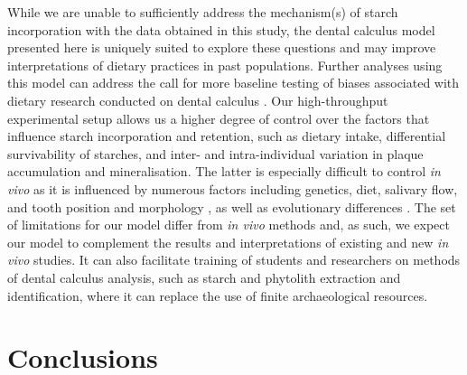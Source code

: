 \documentclass[utf8]{../templates/frontiersSCNS}
\begin{document}
While we are unable to sufficiently address the
mechanism(s) of starch incorporation with the data obtained in this study,
the dental calculus model presented here is uniquely suited to explore
these questions and may improve interpretations of dietary practices in past
populations. Further analyses using this model can address the call for more
baseline testing of biases associated with dietary research conducted on dental calculus
\citep{lemoyneCalculusPretreatments2021}.
Our high-throughput experimental setup allows us a
higher degree of control over the factors that influence starch incorporation and
retention, such as dietary intake, differential survivability of starches,
and inter- and intra-individual variation in plaque accumulation and mineralisation.
The latter is especially difficult to control \emph{in vivo} as it is influenced by
numerous factors including genetics, diet, salivary flow, and tooth position and
morphology
\citep{jepsenCalculusRemoval2011, simonsoroOralGeography2013, proctorSpatialGradient2018, fagernasMicrobialBiogeography2021, haffajeeBiofilmPosition2009},
as well as evolutionary differences \citep{yatesOralMicrobiome2021}. The set of
limitations for our model differ from \emph{in vivo} methods and, as such, we expect
our model to complement the results and interpretations of existing and new
\emph{in vivo} studies.
It can also facilitate training of students and researchers on methods of
dental calculus analysis, such as starch and phytolith extraction and
identification, where it can replace the use of finite archaeological resources.

\section{Conclusions}\label{conclusions}
\end{document}
